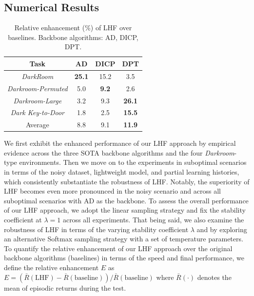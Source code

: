\documentclass{article}
\begin{document}
\subsection{Numerical Results}
\label{exp_numerical_result}

\begin{table}
    \centering
    \caption{Relative enhancement (\%) of LHF over baselines. Backbone algorithms: AD, DICP, DPT.}
    \label{tab_darkrooms_OriginaData_FullHistory}
    \begin{tabular}{cccc}    
        \toprule
        Task & AD & DICP & DPT \\
        \midrule
        \textit{DarkRoom} & \textbf{25.1} & 15.2 & 3.5 \\
        \textit{Darkroom-Permuted} & 5.0 & \textbf{9.2} & 2.6 \\
        \textit{Darkroom-Large} & 3.2 & 9.3 & \textbf{26.1} \\
        \textit{Dark Key-to-Door} & 1.8 & 2.5 & \textbf{15.5} \\
        \midrule
        Average & 8.8 & 9.1 & \textbf{11.9} \\
        \bottomrule
    \end{tabular}
    \vspace{-5pt}
\end{table}



We first exhibit the enhanced performance of our LHF approach by empirical evidence across the three SOTA backbone algorithms and the four \textit{Darkroom}-type environments. Then we move on to the experiments in suboptimal scenarios in terms of the noisy dataset, lightweight model, and partial learning histories, which consistently substantiate the robustness of LHF. Notably, the superiority of LHF becomes even more pronounced in the noisy scenario and across all suboptimal scenarios with AD as the backbone. 
%
To assess the overall performance of our LHF approach, we adopt the linear sampling strategy and fix the stability coefficient at $\lambda = 1$ across all experiments. That being said, we also examine the robustness of LHF in terms of the varying stability coefficient $\lambda$ and by exploring an alternative Softmax sampling strategy with a set of temperature parameters.
%
To quantify the relative enhancement of our LHF approach over the original backbone algorithms (baselines) in terms of the speed and final performance, we define the relative enhancement $E$ as $E = (\bar{R}(\text{LHF}) - \bar{R}(\text{baseline})) / \bar{R}(\text{baseline})$ where $\bar{R}(\cdot)$ denotes the mean of episodic returns during the test.
\end{document}
